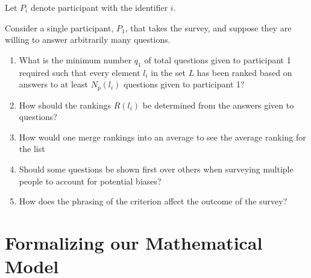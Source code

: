 \documentclass[12pt]{book}
\theoremstyle{definitionstyle}
\numberwithin{equation}{section}
\begin{document}
Let $P_i$ denote participant with the identifier $i$.

Consider a single participant, $P_1$, that takes the survey, and suppose they are willing to answer arbitrarily many questions.

\begin{enumerate}[label=\roman*)]
    \item What is the minimum number $q_1$ of total questions given to participant 1 required such that every element $l_i$ in the set $L$ has been ranked based on answers to at least $N_p(l_i)$ questions given to participant 1?
    \item How should the rankings $R(l_i)$ be determined from the answers given to questions?
    \item How would one merge rankings into an average to see the average ranking for the list
    \item Should some questions be shown first over others when surveying multiple people to account for potential biases?
    \item How does the phrasing of the criterion affect the outcome of the survey?
\end{enumerate}
 
%

\chapter{Formalizing our Mathematical Model}
\end{document}
